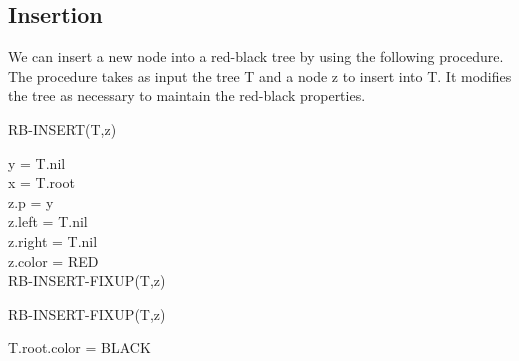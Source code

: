 \newpage
\subsection*{Insertion}

We can insert a new node into a red-black tree by using the following procedure. The procedure takes as input the tree T and a node z to insert into T. It modifies the tree as necessary to maintain the red-black properties.

\begin{algorithm}[H]
    \caption{RB-INSERT(T,z)}
    y = T.nil\\
    x = T.root\\
    z.p = y\\
    z.left = T.nil\\
    z.right = T.nil\\
    z.color = RED\\
    RB-INSERT-FIXUP(T,z)
\end{algorithm}

\begin{algorithm}
    \caption{RB-INSERT-FIXUP(T,z)}
    T.root.color = BLACK
\end{algorithm}

